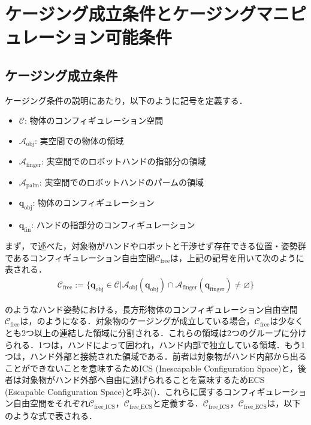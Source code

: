 \documentclass[a4paper,twoside,12pt,papersize, dvipdfmx]{iirthesis}
\begin{document}
\section{ケージング成立条件とケージングマニピュレーション可能条件\cite{komiyama2021}}\label{sec::sicm::caging}
\subsection*{ケージング成立条件}
ケージング条件の説明にあたり，以下のように記号を定義する．
\begin{itemize}
\item $\mathcal{C}$: 物体のコンフィギュレーション空間
\item $\mathcal{A}_{\mathrm{obj}}$: 実空間での物体の領域
\item $\mathcal{A}_{\mathrm{finger}}$: 実空間でのロボットハンドの指部分の領域
\item $\mathcal{A}_{\mathrm{palm}}$: 実空間でのロボットハンドのパームの領域
\item $\bm{q}_{\mathrm{obj}}$: 物体のコンフィギュレーション
\item $\bm{q}_{\mathrm{fin}}$: ハンドの指部分のコンフィギュレーション
\end{itemize}

まず，で述べた，対象物がハンドやロボットと干渉せず存在できる位置・姿勢群であるコンフィギュレーション自由空間$\mathcal{C}_{\mathrm{free}}$は，上記の記号を用いて次のように表される．
\begin{gather}
\mathcal{C}_{\mathrm{free}} :=
\{\bm{q}_{\mathrm{obj}} \in \mathcal{C} | \mathcal{A}_{\mathrm{obj}}(\bm{q}_{\mathrm{obj}})
\cap \mathcal{A}_{\mathrm{finger}}(\bm{q}_{\mathrm{finger}}) \neq \varnothing\}
\label{eq::cfree}
\end{gather}

\figref{}のようなハンド姿勢における，長方形物体のコンフィギュレーション自由空間$\mathcal{C}_{\mathrm{free}}$は，\figref{}のようになる．対象物のケージングが成立している場合，$\mathcal{C}_{\mathrm{free}}$は少なくとも2つ以上の連結した領域に分割される．これらの領域は2つのグループに分けられる．1つは，ハンドによって囲われ，ハンド内部で独立している領域．もう1つは，ハンド外部と接続された領域である．前者は対象物がハンド内部から出ることができないことを意味するためICS (Inescapable Configuration Space)と，後者は対象物がハンド外部へ自由に逃げられることを意味するためECS (Escapable Configuration Space)と呼ぶ(\figref{})．これらに属するコンフィギュレーション自由空間をそれぞれ$\mathcal{C}_{\mathrm{free\_ICS}}$，$\mathcal{C}_{\mathrm{free\_ECS}}$と定義する．$\mathcal{C}_{\mathrm{free\_ICS}}$，$\mathcal{C}_{\mathrm{free\_ECS}}$は，以下のような式で表される．
\end{document}
